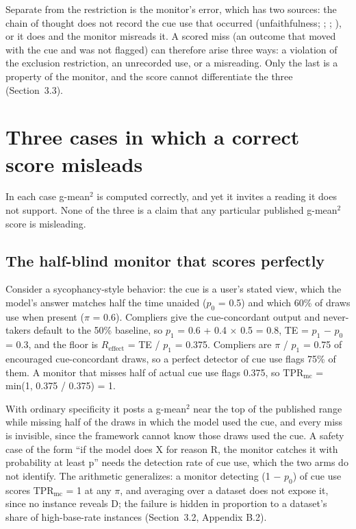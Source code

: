 \documentclass[11pt,a4paper]{article}
\begin{document}
Separate from the restriction is the monitor’s error, which has two sources: the chain of thought does not record the cue use that occurred (unfaithfulness; \citealp{turpin2023language}; \citealp{lanham2023measuring}; \citealp{chen2025reasoning}), or it does and the monitor misreads it. A scored miss (an outcome that moved with the cue and was not flagged) can therefore arise three ways: a violation of the exclusion restriction, an unrecorded use, or a misreading. Only the last is a property of the monitor, and the score cannot differentiate the three (Section~3.3).

\section{Three cases in which a correct score misleads}
In each case g-mean$^2$ is computed correctly, and yet it invites a reading it does not support. None of the three is a claim that any particular published g-mean$^2$ score is misleading.

\subsection{The half-blind monitor that scores perfectly}
Consider a sycophancy-style behavior: the cue is a user’s stated view, which the model’s answer matches half the time unaided ($p_0$ = 0.5) and which 60\% of draws use when present ($\pi$ = 0.6). Compliers give the cue-concordant output and never-takers default to the 50\% baseline, so $p_1$ = 0.6 + 0.4 $\times$ 0.5 = 0.8, TE = $p_1$ $-$ $p_0$ = 0.3, and the floor is $R_{\mathrm{effect}}$ = TE / $p_1$ = 0.375. Compliers are $\pi$ / $p_1$ = 0.75 of encouraged cue-concordant draws, so a perfect detector of cue use flags 75\% of them. A monitor that misses half of actual cue use flags 0.375, so $\mathrm{TPR}_{\mathrm{mc}}$ = min(1, 0.375 / 0.375) = 1.

With ordinary specificity it posts a g-mean$^2$ near the top of the published range while missing half of the draws in which the model used the cue, and every miss is invisible, since the framework cannot know those draws used the cue. A safety case of the form “if the model does X for reason R, the monitor catches it with probability at least p” needs the detection rate of cue use, which the two arms do not identify. The arithmetic generalizes: a monitor detecting (1 $-$ $p_0$) of cue use scores $\mathrm{TPR}_{\mathrm{mc}}$ = 1 at any $\pi$, and averaging over a dataset does not expose it, since no instance reveals D; the failure is hidden in proportion to a dataset’s share of high-base-rate instances (Section~3.2, Appendix B.2).
\end{document}
